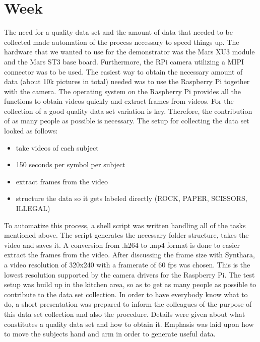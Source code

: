 \chapter{Week}
The need for a quality data set and the amount of data that needed to be collected made automation of the process necessary to speed things up. The hardware that we wanted to use for the demonstrator was the Mars XU3 module and the Mars ST3 base board. Furthermore, the RPi camera utilizing a \ac{MIPI} connector was to be used. The easiest way to obtain the necessary amount of data (about 10k pictures in total) needed was to use the Raspberry Pi together with the camera. The operating system on the Raspberry Pi provides all the functions to obtain videos quickly and extract frames from videos. For the collection of a good quality data set variation is key. Therefore, the contribution of as many people as possible is necessary. The setup for collecting the data set looked as follows:
\begin{itemize}
	\item take videos of each subject
	\item 150 seconds per symbol per subject
	\item extract frames from the video
	\item structure the data so it gets labeled directly (ROCK, PAPER, SCISSORS, ILLEGAL)
\end{itemize}
To automatize this process, a shell script was written handling all of the tasks mentioned above. The script generates the necessary folder structure, takes the video and saves it. A conversion from .h264 to .mp4 format is done to easier extract the frames from the video. After discussing the frame size with Synthara, a video resolution of 320x240 with a framerate of 60 fps was chosen. This is the lowest resolution supported by the camera drivers for the Raspberry Pi.
The test setup was build up in the kitchen area, so as to get as many people as possible to contribute to the data set collection. In order to have everybody know what to do, a short presentation was prepared to inform the colleagues of the purpose of this data set collection and also the procedure. Details were given about what constitutes a quality data set and how to obtain it. Emphasis was laid upon how to move the subjects hand and arm in order to generate useful data.